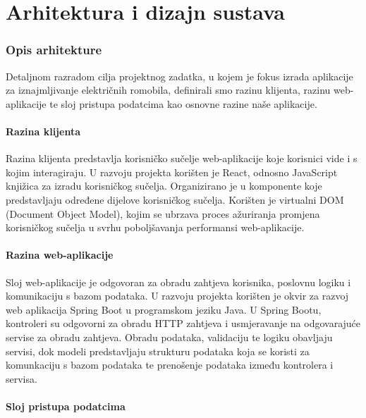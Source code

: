 \chapter{Arhitektura i dizajn sustava}

\subsection{Opis arhitekture}

Detaljnom razradom cilja projektnog zadatka, u kojem je fokus izrada aplikacije za iznajmljivanje električnih romobila, definirali smo razinu klijenta, razinu web-aplikacije te sloj pristupa podatcima kao osnovne razine naše aplikacije.
\newline
\subsubsection{Razina klijenta}

Razina klijenta predstavlja korisničko sučelje web-aplikacije koje korisnici vide i s kojim interagiraju. U razvoju projekta korišten je React, odnosno JavaScript knjižica za izradu korisničkog sučelja. Organizirano je u komponente koje predstavljaju određene dijelove korisničkog sučelja. Korišten je virtualni DOM (Document Object Model), kojim se ubrzava proces ažuriranja promjena korisničkog sučelja u svrhu poboljšavanja performansi web-aplikacije.
\newline
\subsubsection{Razina web-aplikacije}

Sloj web-aplikacije je odgovoran za obradu zahtjeva korisnika, poslovnu logiku i komunikaciju s bazom podataka. U razvoju projekta korišten je okvir za razvoj web aplikacija Spring Boot u programskom jeziku Java. U Spring Bootu, kontroleri su odgovorni za obradu HTTP zahtjeva i usmjeravanje na odgovarajuće servise za obradu zahtjeva. Obradu podataka, validaciju te logiku obavljaju servisi, dok modeli predstavljaju strukturu podataka koja se koristi za komunkaciju s bazom podataka te prenošenje podataka između kontrolera i servisa.
\newline

\subsubsection{Sloj pristupa podatcima}

